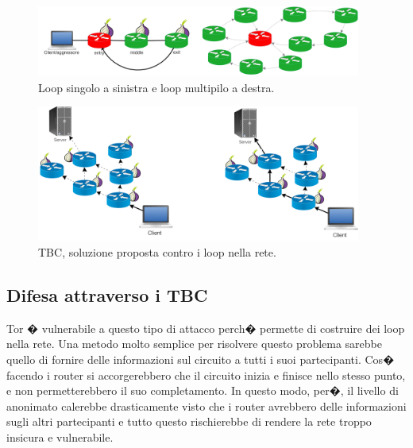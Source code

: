\begin{figure}[!htbp]
\centering
\includegraphics[width=0.95\textwidth]{./figure//packetspinning}
\caption{Loop singolo a sinistra e loop multipilo a destra.}
\label{FIG:PacketSpinning}
\end{figure}

\begin{figure}[!htbp]
\centering
\includegraphics[width=0.95\textwidth]{./figure//TBC}
\caption{TBC, soluzione proposta contro i loop nella rete.}
\label{FIG:tbc}
\end{figure}

\subsection{Difesa attraverso i TBC}
Tor � vulnerabile a questo tipo di attacco perch� permette di costruire dei loop nella rete. Una metodo molto semplice per risolvere questo problema sarebbe quello di fornire delle informazioni sul circuito a tutti i suoi partecipanti. Cos� facendo i router si accorgerebbero che il circuito inizia e finisce nello stesso punto, e non permetterebbero il suo completamento. In questo modo, per�, il livello di anonimato calerebbe drasticamente visto che i router avrebbero delle informazioni sugli altri partecipanti e tutto questo rischierebbe di rendere la rete troppo insicura e vulnerabile.


